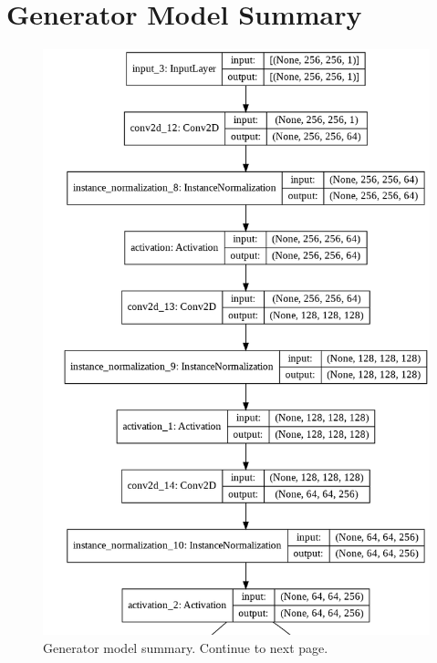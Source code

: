 \section{Generator Model Summary}
\vspace*{2.2cm}
\begin{figure}[H]
	    \begin{center} 
	    \includegraphics[scale=0.60]{images/Appendix/generator_1.png}
	     \caption{Generator model summary. Continue to next page.}
	     \label{fig:GeneratorModelSummary}
	    \end{center}
\end{figure}


